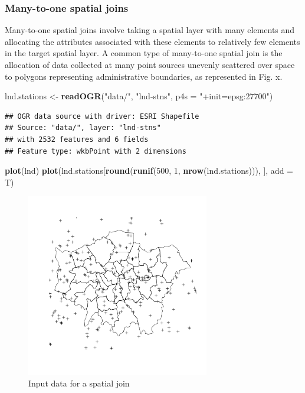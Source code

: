 \documentclass[]{article}
\newenvironment{Shaded}{}{}
\newcommand{\KeywordTok}[1]{\textcolor[rgb]{0.00,0.44,0.13}{\textbf{{#1}}}}
\newcommand{\DataTypeTok}[1]{\textcolor[rgb]{0.56,0.13,0.00}{{#1}}}
\newcommand{\DecValTok}[1]{\textcolor[rgb]{0.25,0.63,0.44}{{#1}}}
\newcommand{\StringTok}[1]{\textcolor[rgb]{0.25,0.44,0.63}{{#1}}}
\newcommand{\NormalTok}[1]{{#1}}
\let\Oldincludegraphics\includegraphics
\renewcommand{\includegraphics}[1]{\Oldincludegraphics[width=8cm]{#1}}
\begin{document}
\subsubsection{Many-to-one spatial joins}

Many-to-one spatial joins involve taking a spatial layer with many
elements and allocating the attributes associated with these elements to
relatively few elements in the target spatial layer. A common type of
many-to-one spatial join is the allocation of data collected at many
point sources unevenly scattered over space to polygons representing
administrative boundaries, as represented in Fig. x.

\begin{Shaded}
\begin{Highlighting}[]
\NormalTok{lnd.stations <- }\KeywordTok{readOGR}\NormalTok{(}\StringTok{"data/"}\NormalTok{, }\StringTok{"lnd-stns"}\NormalTok{, }\DataTypeTok{p4s =} \StringTok{"+init=epsg:27700"}\NormalTok{)}
\end{Highlighting}
\end{Shaded}
\begin{verbatim}
## OGR data source with driver: ESRI Shapefile 
## Source: "data/", layer: "lnd-stns"
## with 2532 features and 6 fields
## Feature type: wkbPoint with 2 dimensions
\end{verbatim}
\begin{Shaded}
\begin{Highlighting}[]
\KeywordTok{plot}\NormalTok{(lnd)}
\KeywordTok{plot}\NormalTok{(lnd.stations[}\KeywordTok{round}\NormalTok{(}\KeywordTok{runif}\NormalTok{(}\DecValTok{500}\NormalTok{, }\DecValTok{1}\NormalTok{, }\KeywordTok{nrow}\NormalTok{(lnd.stations))), ], }\DataTypeTok{add =} \NormalTok{T)}
\end{Highlighting}
\end{Shaded}
\begin{figure}[htbp]
\centering
\includegraphics{figure/Input_data_for_a_spatial_join.png}
\caption{Input data for a spatial join}
\end{figure}
\end{document}
